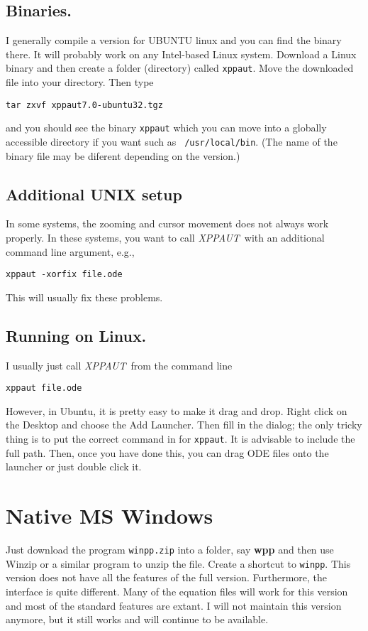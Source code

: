\documentclass{article}
\newcommand{\XPP}{{\sl XPPAUT\, }}
\begin{document}
\subsection{Binaries.} I generally compile a version for UBUNTU linux
and you can find the binary there. It will probably work on any
Intel-based Linux system.  Download a Linux binary and then create a
folder (directory) called {\tt xppaut}. Move the downloaded file into
your directory. Then type
\begin{verbatim}
tar zxvf xppaut7.0-ubuntu32.tgz
\end{verbatim}
and you should see the binary {\tt xppaut} which you can move into a
globally accessible directory if you want such as {\tt
/usr/local/bin}. (The name of the binary file may be diferent depending on the version.)
\subsection{Additional UNIX setup} In some systems, the zooming
and cursor movement does not always work properly.  In these systems,
you want to call \XPP with an additional command line argument, e.g.,
\begin{verbatim}
xppaut -xorfix file.ode
\end{verbatim}
This will usually fix these problems.

\subsection{Running on Linux.}
I usually just call \XPP from the command line
\begin{verbatim}
xppaut file.ode
\end{verbatim}
However, in Ubuntu, it is pretty easy to make it drag and drop. Right
click on the Desktop and choose the Add Launcher. Then fill in the
dialog; the only tricky thing is to put the correct command in for
{\tt xppaut}. It is advisable to include the full path. Then, once you
have done this, you can drag ODE files onto the launcher or just
double click it.


\section{Native MS Windows}
Just download the program {\tt winpp.zip} into a folder, say {\bf wpp}
and then use Winzip or a similar program to unzip the file. Create a
shortcut to {\tt winpp}.  This version does not have all the features
of the full version. Furthermore, the interface is quite
different. Many of the equation files will work for this version and
most of the standard features are extant. I will not maintain this
version anymore, but it still works and will continue to be available.
\end{document}
